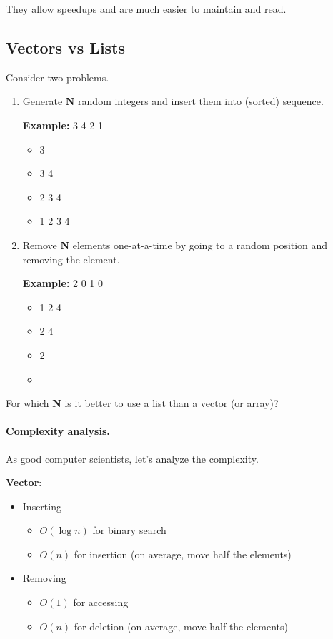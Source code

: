 \documentclass[a4paper]{report}
\begin{document}
\noindent
They allow speedups and are much easier to maintain and read.

\subsection*{Vectors vs Lists}
Consider two
problems.

\begin{enumerate}
\item Generate {\bf N} random integers and insert them into (sorted)
      sequence.
      
      {\bf Example:} 3 4 2 1
      
      \begin{itemize}
        \item 3
        \item 3 4
        \item 2 3 4
        \item 1 2 3 4
      \end{itemize}

\item Remove {\bf N} elements one-at-a-time by going to a random position
      and removing the element.

      {\bf Example:} 2 0 1 0
      
      \begin{itemize}
        \item 1 2 4
        \item 2 4
        \item 2
        \item 
      \end{itemize}
\end{enumerate}

For which {\bf N} is it better to use a list than a vector (or array)?

 
\paragraph{Complexity analysis.} As good computer scientists, let's analyze
the complexity.  

{\bf Vector}:\\[-2em]
      \begin{itemize}
        \item Inserting\\[-2em]
          \begin{itemize}
            \item $O(\log n)$ for binary search
            \item $O(n)$ for insertion (on average, move half the elements)
          \end{itemize}
        \item Removing\\[-2em]
          \begin{itemize}
            \item $O(1)$ for accessing
            \item $O(n)$ for deletion (on average, move half the elements)
          \end{itemize}
      \end{itemize}
\end{document}
